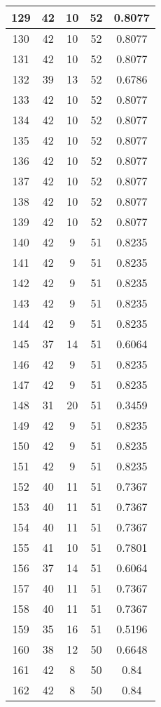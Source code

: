 \documentclass[letterpaper, 12pt]{article}
\begin{document}
\begin{longtable}{|c|c|c|c|c|}
\hline
129 & 42 & 10 & 52 & 0.8077 \\
\hline
130 & 42 & 10 & 52 & 0.8077 \\
\hline
131 & 42 & 10 & 52 & 0.8077 \\
\hline
132 & 39 & 13 & 52 & 0.6786 \\
\hline
133 & 42 & 10 & 52 & 0.8077 \\
\hline
134 & 42 & 10 & 52 & 0.8077 \\
\hline
135 & 42 & 10 & 52 & 0.8077 \\
\hline
136 & 42 & 10 & 52 & 0.8077 \\
\hline
137 & 42 & 10 & 52 & 0.8077 \\
\hline
138 & 42 & 10 & 52 & 0.8077 \\
\hline
139 & 42 & 10 & 52 & 0.8077 \\
\hline
140 & 42 & 9 & 51 & 0.8235 \\
\hline
141 & 42 & 9 & 51 & 0.8235 \\
\hline
142 & 42 & 9 & 51 & 0.8235 \\
\hline
143 & 42 & 9 & 51 & 0.8235 \\
\hline
144 & 42 & 9 & 51 & 0.8235 \\
\hline
145 & 37 & 14 & 51 & 0.6064 \\
\hline
146 & 42 & 9 & 51 & 0.8235 \\
\hline
147 & 42 & 9 & 51 & 0.8235 \\
\hline
148 & 31 & 20 & 51 & 0.3459 \\
\hline
149 & 42 & 9 & 51 & 0.8235 \\
\hline
150 & 42 & 9 & 51 & 0.8235 \\
\hline
151 & 42 & 9 & 51 & 0.8235 \\
\hline
152 & 40 & 11 & 51 & 0.7367 \\
\hline
153 & 40 & 11 & 51 & 0.7367 \\
\hline
154 & 40 & 11 & 51 & 0.7367 \\
\hline
155 & 41 & 10 & 51 & 0.7801 \\
\hline
156 & 37 & 14 & 51 & 0.6064 \\
\hline
157 & 40 & 11 & 51 & 0.7367 \\
\hline
158 & 40 & 11 & 51 & 0.7367 \\
\hline
159 & 35 & 16 & 51 & 0.5196 \\
\hline
160 & 38 & 12 & 50 & 0.6648 \\
\hline
161 & 42 & 8 & 50 & 0.84 \\
\hline
162 & 42 & 8 & 50 & 0.84 \\

\end{longtable}
\end{document}
